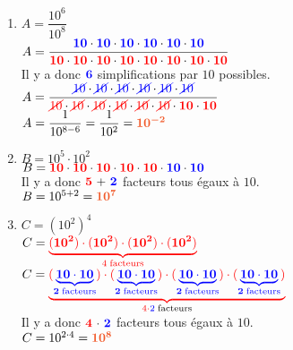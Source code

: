 \documentclass[a4paper,12pt]{report}
\begin{document}
\begin{Correction}
\begin{EXO}{}{}
\begin{enumerate}[itemsep=2em]
\item $A=\dfrac{10^{6}}{10^{8}}$\\$A=\dfrac{\mathbf{\color{blue}{10}} \cdot \mathbf{\color{blue}{10}}\cdot \mathbf{\color{blue}{10}}\cdot \mathbf{\color{blue}{10}}\cdot \mathbf{\color{blue}{10}}\cdot \mathbf{\color{blue}{10}}}{\mathbf{\color{red}{10}} \cdot \mathbf{\color{red}{10}}\cdot \mathbf{\color{red}{10}}\cdot \mathbf{\color{red}{10}}\cdot \mathbf{\color{red}{10}}\cdot \mathbf{\color{red}{10}}\cdot \mathbf{\color{red}{10}}\cdot \mathbf{\color{red}{10}}}$\\Il y a donc $\mathbf{\color{blue}{6}}$ simplifications par $10$ possibles.\\$A=\dfrac{\mathbf{\color{blue}{\cancel{10}}} \cdot \mathbf{\color{blue}{\cancel{10}}}\cdot \mathbf{\color{blue}{\cancel{10}}}\cdot \mathbf{\color{blue}{\cancel{10}}}\cdot \mathbf{\color{blue}{\cancel{10}}}\cdot \mathbf{\color{blue}{\cancel{10}}}}{\mathbf{\color{red}{\cancel{10}}} \cdot \mathbf{\color{red}{\cancel{10}}}\cdot \mathbf{\color{red}{\cancel{10}}}\cdot \mathbf{\color{red}{\cancel{10}}}\cdot \mathbf{\color{red}{\cancel{10}}}\cdot \mathbf{\color{red}{\cancel{10}}}\cdot\mathbf{\color{red}{10}} \cdot \mathbf{\color{red}{10}}}$\\$A=\dfrac{1}{10^{8-6}}=\dfrac{1}{10^{2}}={\color[HTML]{f15929}\boldsymbol{10^{-2}}}$
\item $B=10^{5}\cdot 10^{2}$\\$B=\mathbf{\color{red}{10}} \cdot \mathbf{\color{red}{10}}\cdot \mathbf{\color{red}{10}}\cdot \mathbf{\color{red}{10}}\cdot \mathbf{\color{red}{10}} \cdot \mathbf{\color{blue}{10}} \cdot \mathbf{\color{blue}{10}}$\\Il y a donc $\mathbf{\color{red}{5}~\color{black}{+}~\color{blue}{2}}$ facteurs tous égaux à $10$.\\$B=10^{5 +  2} = {\color[HTML]{f15929}\boldsymbol{10^{7}}}$
\item $C=(10^{2})^{4}$\\$C=\color{red}{\underbrace{\mathbf{\color{red}{(10^2)}} \cdot \mathbf{\color{red}{(10^2)}}\cdot \mathbf{\color{red}{(10^2)}}\cdot \mathbf{\color{red}{(10^2)}}}_{4\thickspace\text{facteurs}}}$\\$C=\color{red}{\underbrace{\mathbf{\color{red}{(\color{blue}{\underbrace{\mathbf{\color{blue}{10}} \cdot \mathbf{\color{blue}{10}}}_{2\thickspace\text{facteurs}}}\color{red})}} \cdot \mathbf{\color{red}{(\color{blue}{\underbrace{\mathbf{\color{blue}{10}} \cdot \mathbf{\color{blue}{10}}}_{2\thickspace\text{facteurs}}}\color{red})}}\cdot \mathbf{\color{red}{(\color{blue}{\underbrace{\mathbf{\color{blue}{10}} \cdot \mathbf{\color{blue}{10}}}_{2\thickspace\text{facteurs}}}\color{red})}}\cdot \mathbf{\color{red}{(\color{blue}{\underbrace{\mathbf{\color{blue}{10}} \cdot \mathbf{\color{blue}{10}}}_{2\thickspace\text{facteurs}}}\color{red})}}}_{4\cdot\color{blue}{2}\thickspace\color{black}{\text{facteurs}}}}$\\Il y a donc $\mathbf{\color{red}{4}~\color{black}{\cdot}~\color{blue}{2}}$ facteurs tous égaux à $10$.\\$C=10^{2\cdot4} = {\color[HTML]{f15929}\boldsymbol{10^{8}}}$

\end{enumerate}
\end{EXO}
\end{Correction}
\end{document}
